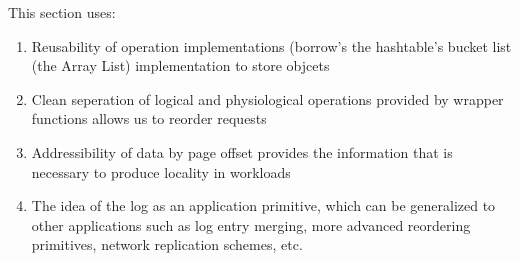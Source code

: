 \documentclass[letterpaper,twocolumn,english]{article}
\begin{document}
This section uses:

\begin{enumerate}
\item{Reusability of operation implementations (borrow's the hashtable's bucket list (the Array List) implementation to store objcets}
\item{Clean seperation of logical and physiological operations provided by wrapper functions allows us to reorder requests}
\item{Addressibility of data by page offset provides the information that is necessary to produce locality in workloads}
\item{The idea of the log as an application primitive, which can be generalized to other applications such as log entry merging, more advanced reordering primitives, network replication schemes, etc.} 
\end{enumerate}
%
%
%
%    
% 
%
%
%
%
%
%    
%
%
\end{document}
